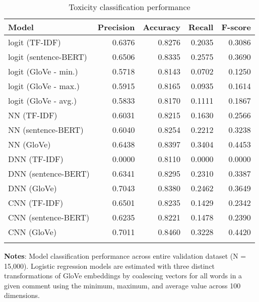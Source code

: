 \begin{table}[h]
	\caption{Toxicity classification performance \label{table:performance-total}}
    \centering
	\begin{tabular}{lrrrr}
		\toprule
			Model &  Precision &  Accuracy &  Recall &  F-score \\
		\midrule
			\addlinespace{}
			\parbox{7.5cm}{logit (TF-IDF)} &     0.6376 &    0.8276 &  0.2035 &   0.3086 \\
			\addlinespace{}
			logit (sentence-BERT) &     0.6506 &    0.8335 &  0.2575 &   0.3690 \\
			\addlinespace{}
			logit (GloVe - min.) &     0.5718 &    0.8143 &  0.0702 &   0.1250 \\
			\addlinespace{}
			logit (GloVe - max.) &     0.5915 &    0.8165 &  0.0935 &   0.1614 \\
			\addlinespace{}
			logit (GloVe - avg.) &     0.5833 &    0.8170 &  0.1111 &   0.1867 \\
			\addlinespace{}
			NN (TF-IDF) &     0.6031 &    0.8215 &  0.1630 &   0.2566 \\
			\addlinespace{}
			NN (sentence-BERT) &     0.6040 &    0.8254 &  0.2212 &   0.3238 \\
			\addlinespace{}
			NN (GloVe) &     0.6438 &    0.8397 &  0.3404 &   0.4453 \\
			\addlinespace{}
			DNN (TF-IDF) &     0.0000 &    0.8110 &  0.0000 &   0.0000 \\
			\addlinespace{}
			DNN (sentence-BERT) &     0.6341 &    0.8295 &  0.2310 &   0.3387 \\
			\addlinespace{}
			DNN (GloVe) &     0.7043 &    0.8380 &  0.2462 &   0.3649 \\
			\addlinespace{}
			CNN (TF-IDF) &      0.6501 &    0.8235 &  0.1429 &   0.2342 \\
			\addlinespace{}
			CNN (sentence-BERT)  &     0.6235 &    0.8221 &  0.1478 &   0.2390 \\
			\addlinespace{}
			CNN (GloVe)  &     0.7011 &    0.8460 &  0.3228 &   0.4420 \\
	\bottomrule
	\addlinespace[1em]
	\end{tabular}
	\parbox{14.5cm}{\textbf{Notes}: Model classification performance across entire validation dataset (N = 15,000). Logistic regression models are estimated with three distinct transformations of GloVe embeddings by coalescing vectors for all words in a given comment using the minimum, maximum, and average value across 100 dimensions.}
\end{table}

